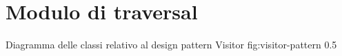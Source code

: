 \section{Modulo di traversal}

      {Diagramma delle classi relativo al design pattern Visitor}
      {fig:visitor-pattern}
      {0.5}




